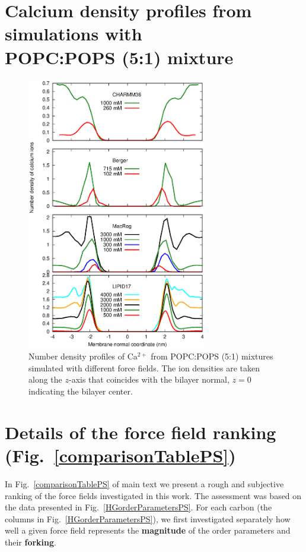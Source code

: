 \documentclass[journal=jpcbfk,manuscript=article]{achemso}
\newcommand{\todo}[1]{\textcolor{red}{#1}}
\begin{document}
\section{Calcium density profiles from simulations with \\ POPC:POPS (5:1) mixture}
\begin{figure}[!h]
  \centering
  \includegraphics[width=0.7\textwidth]{../Figs/CAdensPCPSmixture.eps}
  \caption{\label{CAdensPCPSmixtureALL}
    Number density profiles of Ca$^{2+}$ from POPC:POPS (5:1) mixtures simulated with different force fields. The ion densities are taken along the $z$-axis that coincides with the bilayer normal, $z=0$ indicating the bilayer center.
  }
\end{figure}

\clearpage

\section{Details of the force field ranking (Fig.~\ref{comparisonTablePS})}\label{Ranking} 
In Fig.~\ref{comparisonTablePS} of main text we present a rough and subjective ranking of the force fields investigated in this work. 
The assessment was based on the data presented in Fig.~\ref{HGorderParametersPS}.
%
For each carbon (the columns in Fig.~\ref{HGorderParametersPS}),
we first investigated separately how well a given force field represents the {\bf magnitude} of the order parameters and their {\bf forking}.
\end{document}
